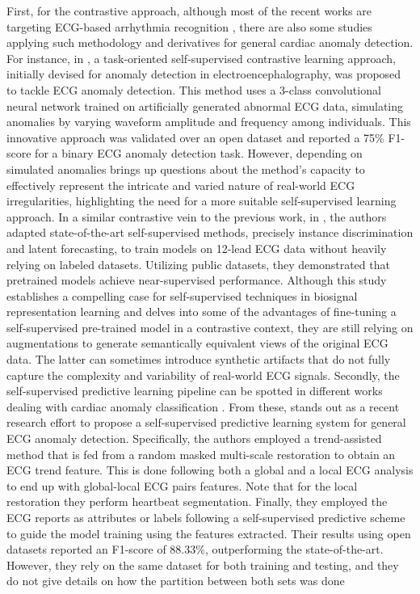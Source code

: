 First, for the contrastive approach, although most of the recent works are targeting ECG-based arrhythmia recognition \cite{kiyasseh2021clocs,wei2022contrastive,lan2022intra,phan2022multimodality,jin2024self}, there are also some studies applying such methodology and derivatives for general cardiac anomaly detection. For instance, in \cite{zheng2022task}, a task-oriented self-supervised contrastive learning approach, initially devised for anomaly detection in electroencephalography, was proposed to tackle ECG anomaly detection. This method uses a 3-class convolutional neural network trained on artificially generated abnormal ECG data, simulating anomalies by varying waveform amplitude and frequency among individuals. This innovative approach was validated over an open dataset and reported a 75\% F1-score for a binary ECG anomaly detection task. However, depending on simulated anomalies brings up questions about the method's capacity to effectively represent the intricate and varied nature of real-world ECG irregularities, highlighting the need for a more suitable self-supervised learning approach. In a similar contrastive vein to the previous work, in \cite{mehari2022self}, the authors adapted state-of-the-art self-supervised methods, precisely instance discrimination and latent forecasting, to train models on 12-lead ECG data without heavily relying on labeled datasets. Utilizing public datasets, they demonstrated that pretrained models achieve near-supervised performance. Although this study establishes a compelling case for self-supervised techniques in biosignal representation learning and delves into some of the advantages of fine-tuning a self-supervised pre-trained model in a contrastive context, they are still relying on augmentations to generate semantically equivalent views of the original ECG data. The latter can sometimes introduce synthetic artifacts that do not fully capture the complexity and variability of real-world ECG signals. Secondly, the self-supervised predictive learning pipeline can be spotted in different works dealing with cardiac anomaly classification \cite{9630616,lee2021self,ZHANG2023104194,alamr2023unsupervised,jiang2024anomaly}. From these, \cite{jiang2024anomaly} stands out as a recent research effort to propose a self-supervised predictive learning system for general ECG anomaly detection. Specifically, the authors employed a trend-assisted method that is fed from a random masked multi-scale restoration to obtain an ECG trend feature. This is done following both a global and a local ECG analysis to end up with global-local ECG pairs features. Note that for the local restoration they perform heartbeat segmentation. Finally, they employed the ECG reports as attributes or labels following a self-supervised predictive scheme to guide the model training using the features extracted. Their results using open datasets reported an F1-score of 88.33\%, outperforming the state-of-the-art. However, they rely on the same dataset for both training and testing, and they do not give details on how the partition between both sets was done %

